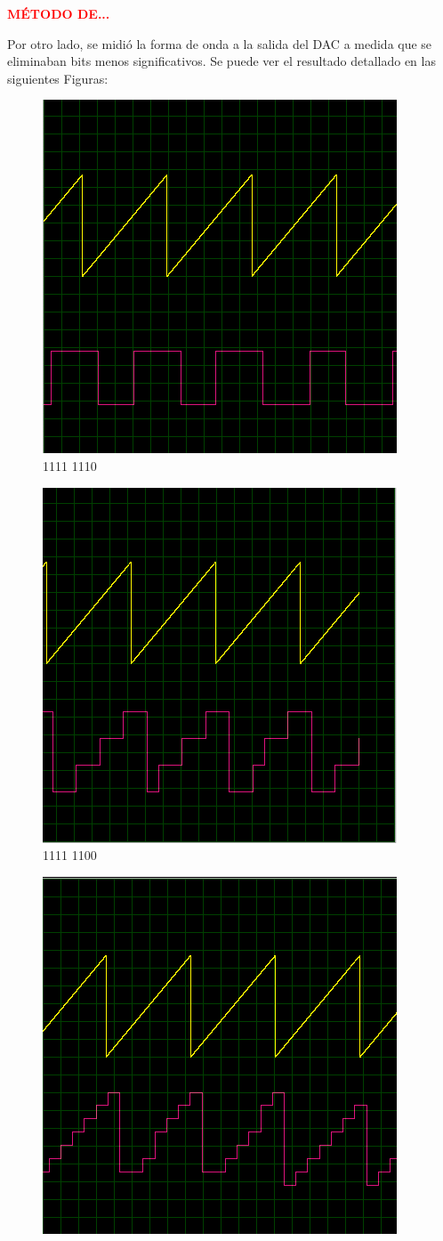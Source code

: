 \begin{center}
	\LARGE{\textcolor{red}{\textbf{MÉTODO DE...}}}
\end{center}

Por otro lado, se midió la forma de onda a la salida del DAC a medida que se eliminaban bits menos significativos. Se puede ver el resultado detallado en las siguientes Figuras:

\newpage

\begin{multicols}{2}
\begin{figure}[H]
\centering
\includegraphics[width=0.5\linewidth]{ImagenesEjercicio1/bit1.png}
\caption{1111 1110}
\end{figure}
\begin{figure}[H]
\centering
\includegraphics[width=0.5\linewidth]{ImagenesEjercicio1/bit2.png}
\caption{1111 1100}
\end{figure}
\begin{figure}[H]
\centering
\includegraphics[width=0.5\linewidth]{ImagenesEjercicio1/bit3.png}

\end{figure}
\end{multicols}
